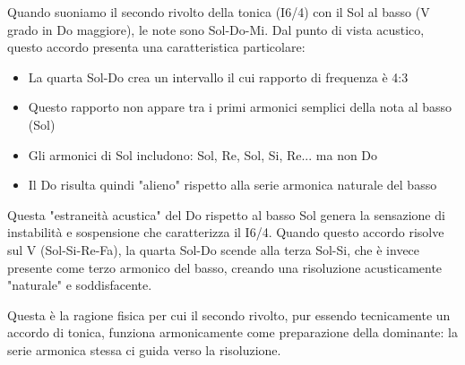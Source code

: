 \begin{fisica}
	Quando suoniamo il secondo rivolto della tonica (I6/4) con il Sol al basso (V grado in Do maggiore), le note sono Sol-Do-Mi. Dal punto di vista acustico, questo accordo presenta una caratteristica particolare:
	
	\begin{itemize}
		\item La quarta Sol-Do crea un intervallo il cui rapporto di frequenza è 4:3
		\item Questo rapporto non appare tra i primi armonici semplici della nota al basso (Sol)
		\item Gli armonici di Sol includono: Sol, Re, Sol, Si, Re... ma non Do
		\item Il Do risulta quindi "alieno" rispetto alla serie armonica naturale del basso
	\end{itemize}
	
	Questa "estraneità acustica" del Do rispetto al basso Sol genera la sensazione di instabilità e sospensione che caratterizza il I6/4. Quando questo accordo risolve sul V (Sol-Si-Re-Fa), la quarta Sol-Do scende alla terza Sol-Si, che è invece presente come terzo armonico del basso, creando una risoluzione acusticamente "naturale" e soddisfacente.
	
	Questa è la ragione fisica per cui il secondo rivolto, pur essendo tecnicamente un accordo di tonica, funziona armonicamente come preparazione della dominante: la serie armonica stessa ci guida verso la risoluzione.
\end{fisica}

